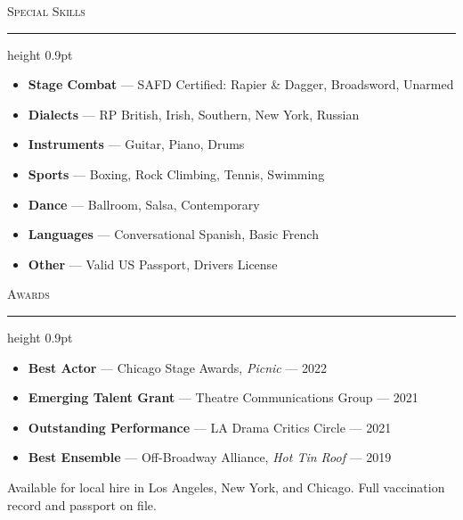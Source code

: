 \documentclass[11pt,letterpaper]{article}
\newcommand{\ressection}[1]{%
  \vspace{0.9em}%
  {\large\scshape\color{primary}#1}%
  \vspace{1pt}%
  \par{\color{accent}\hrule height 0.9pt}%
  \vspace{0.45em}%
}
\begin{document}
\begin{minipage}[t]{0.34\textwidth}
  \begin{tcolorbox}[
    colframe=primary!15,
    colback=lightbg,
    boxrule=0.5pt,
    arc=1.5mm,
    left=3mm,right=3mm,top=2mm,bottom=2mm,
    width=\linewidth
  ]
    \ressection{Special Skills}

    \begin{itemize}[leftmargin=*,itemsep=1pt]
      \item {\footnotesize\textbf{Stage Combat} --- SAFD Certified: Rapier \& Dagger, Broadsword, Unarmed}
      \item {\footnotesize\textbf{Dialects} --- RP British, Irish, Southern, New York, Russian}
      \item {\footnotesize\textbf{Instruments} --- Guitar, Piano, Drums}
      \item {\footnotesize\textbf{Sports} --- Boxing, Rock Climbing, Tennis, Swimming}
      \item {\footnotesize\textbf{Dance} --- Ballroom, Salsa, Contemporary}
      \item {\footnotesize\textbf{Languages} --- Conversational Spanish, Basic French}
      \item {\footnotesize\textbf{Other} --- Valid US Passport, Driver{\textquotesingle}s License}
    \end{itemize}
  \end{tcolorbox}

  \vspace{0.5em}

  \begin{tcolorbox}[
    colframe=primary!15,
    colback=lightbg,
    boxrule=0.5pt,
    arc=1.5mm,
    left=3mm,right=3mm,top=2mm,bottom=2mm,
    width=\linewidth
  ]
    \ressection{Awards}

    \begin{itemize}[leftmargin=*,itemsep=2pt]
      \item {\footnotesize\textbf{Best Actor} --- Chicago Stage Awards, \textit{Picnic} --- 2022}
      \item {\footnotesize\textbf{Emerging Talent Grant} --- Theatre Communications Group --- 2021}
      \item {\footnotesize\textbf{Outstanding Performance} --- LA Drama Critics Circle --- 2021}
      \item {\footnotesize\textbf{Best Ensemble} --- Off-Broadway Alliance, \textit{Hot Tin Roof} --- 2019}
    \end{itemize}
  \end{tcolorbox}

  \vspace{0.5em}

  \begin{tcolorbox}[
    colframe=accent!40,
    colback=lightbg,
    boxrule=0.6pt,
    arc=1.5mm,
    left=3mm,right=3mm,top=2mm,bottom=2mm,
    width=\linewidth
  ]
    {\footnotesize\textcolor{primary}{Available for local hire in Los Angeles, New York, and Chicago. Full vaccination record and passport on file.}}
  \end{tcolorbox}
\end{minipage}\hfill
\end{document}
